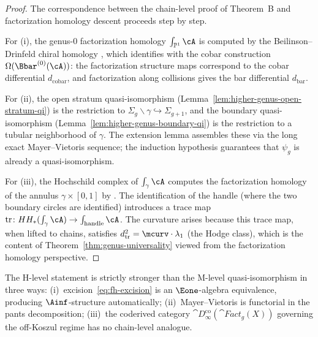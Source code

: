 \begin{proof}
The correspondence between the chain-level proof of Theorem~B and
factorization homology descent proceeds step by step.

For (i), the genus-$0$ factorization homology $\int_{\mathbb{P}^1}\cA$
is computed by the Beilinson--Drinfeld chiral homology
\cite[Theorem~4.3.1]{BD04}, which identifies with the cobar
construction $\Omega(\Bbar^{(0)}(\cA))$: the factorization structure
maps correspond to the cobar differential $d_{\mathrm{cobar}}$,
and factorization along collisions gives the bar differential
$d_{\mathrm{bar}}$.

For (ii), the open stratum quasi-isomorphism
(Lemma~\ref{lem:higher-genus-open-stratum-qi}) is the restriction to
$\Sigma_g \smallsetminus \gamma \hookrightarrow \Sigma_{g+1}$,
and the boundary quasi-isomorphism
(Lemma~\ref{lem:higher-genus-boundary-qi}) is the restriction to
a tubular neighborhood of $\gamma$.  The extension lemma assembles
these via the long exact Mayer--Vietoris sequence; the induction
hypothesis guarantees that $\psi_g$ is already a quasi-isomorphism.

For (iii), the Hochschild complex of $\int_\gamma\cA$ computes
the factorization homology of the annulus $\gamma \times [0,1]$
by \cite[Theorem~5.5.3.10]{HA}.  The identification of the handle
(where the two boundary circles are identified) introduces a trace
map $\mathrm{tr} \colon HH_*(\int_\gamma\cA) \to
\int_{\text{handle}}\cA$.  The curvature arises because this trace
map, when lifted to chains, satisfies $d_{\mathrm{tr}}^2 =
\mcurv \cdot \lambda_1$ (the Hodge class), which is the content of
Theorem~\ref{thm:genus-universality} viewed from the factorization
homology perspective.
\end{proof}

\begin{remark}
\label{rem:why-homotopy-necessary}
The H-level statement is strictly stronger than the M-level
quasi-isomorphism in three ways:
(i)~excision~\eqref{eq:fh-excision} is an $\Eone$-algebra
equivalence, producing $\Ainf$-structure automatically;
(ii)~Mayer--Vietoris is functorial in the pants decomposition;
(iii)~the coderived category
$\cat{D}^{\mathrm{co}}_\infty(\cat{Fact}_g(X))$ governing
the off-Koszul regime has no chain-level analogue.
\end{remark}

